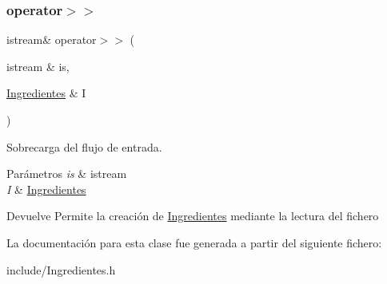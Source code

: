 \subsubsection{\texorpdfstring{operator$>$$>$}{operator>>}}
{\footnotesize\ttfamily istream\& operator$>$$>$ (\begin{DoxyParamCaption}\item[{istream \&}]{is,  }\item[{\hyperlink{classIngredientes}{Ingredientes} \&}]{I }\end{DoxyParamCaption})\hspace{0.3cm}{\ttfamily [friend]}}



Sobrecarga del flujo de entrada. 


\begin{DoxyParams}{Parámetros}
{\em is} & istream \\
\hline
{\em I} & \hyperlink{classIngredientes}{Ingredientes} \\
\hline
\end{DoxyParams}
\begin{DoxyReturn}{Devuelve}
Permite la creación de \hyperlink{classIngredientes}{Ingredientes} mediante la lectura del fichero 
\end{DoxyReturn}


La documentación para esta clase fue generada a partir del siguiente fichero\+:\begin{DoxyCompactItemize}
\item 
include/Ingredientes.\+h\end{DoxyCompactItemize}
